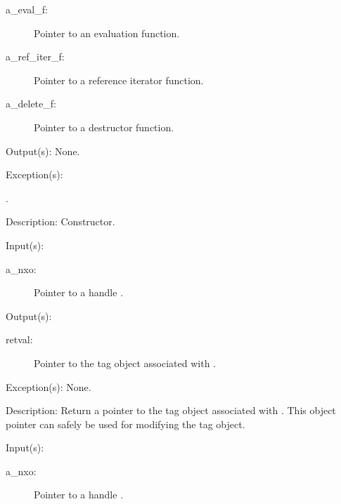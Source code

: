 \begin{capi}
\begin{capilist}
\begin{description}
		\item[a\_eval\_f: ]
			Pointer to an evaluation function.
		\item[a\_ref\_iter\_f: ]
			Pointer to a reference iterator function.
		\item[a\_delete\_f: ]
			Pointer to a destructor function.
		\end{description}
	\item[Output(s): ] None.
	\item[Exception(s): ]
		\begin{description}\item[]
		\item[.]
		\end{description}
	\item[Description: ]
		Constructor.
	\end{capilist}
\label{nxo_handle_tag_get}
	\begin{capilist}
	\item[Input(s): ]
		\begin{description}\item[]
		\item[a\_nxo: ]
			Pointer to a handle .
		\end{description}
	\item[Output(s): ]
		\begin{description}\item[]
		\item[retval: ]
			Pointer to the tag object associated with .
		\end{description}
	\item[Exception(s): ] None.
	\item[Description: ]
		Return a pointer to the tag object associated with
		.  This object pointer can safely be used for
		modifying the tag object.
	\end{capilist}
\label{nxo_handle_data_get}
	\begin{capilist}
	\item[Input(s): ]
		\begin{description}\item[]
		\item[a\_nxo: ]
			Pointer to a handle \classname{nxo}.

\end{description}
\end{capilist}
\end{capi}
